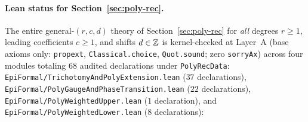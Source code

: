 \paragraph{Lean status for Section~\ref{sec:poly-rec}.}
The entire general-$(r,c,d)$ theory of Section~\ref{sec:poly-rec} for
\emph{all} degrees $r\ge1$, leading coefficients $c\ge1$, and shifts $d\in\mathbb{Z}$
is kernel-checked at Layer~A (base axioms only: \texttt{propext},
\texttt{Classical.choice}, \texttt{Quot.sound}; zero \texttt{sorryAx}) across
four modules totaling $68$ audited declarations under \texttt{PolyRecData}:
\texttt{EpiFormal/\allowbreak TrichotomyAndPolyExtension.lean} ($37$
declarations), \texttt{EpiFormal/\allowbreak PolyGaugeAndPhaseTransition.lean}
($22$ declarations), \texttt{EpiFormal/\allowbreak PolyWeightedUpper.lean} ($1$
declaration), and \texttt{EpiFormal/\allowbreak PolyWeightedLower.lean} ($8$
declarations):
